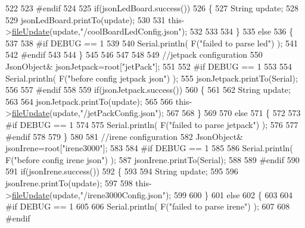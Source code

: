 \begin{DoxyCode}
522 
523 \textcolor{preprocessor}{#endif}
524 
525     \textcolor{keywordflow}{if}(jsonLedBoard.success())
526     \{   
527         String update;
528     
529         jsonLedBoard.printTo(update);
530 
531         this->\hyperlink{classCoolFileSystem_a13f2958f5b87757c31fc53797a30d23a}{fileUpdate}(update,\textcolor{stringliteral}{"/coolBoardLedConfig.json"});      
532 
533     
534     \}
535     \textcolor{keywordflow}{else}
536     \{
537     
538 \textcolor{preprocessor}{    #if DEBUG == 1 }
539 
540         Serial.println( F(\textcolor{stringliteral}{"failed to parse led"}) );
541     
542 \textcolor{preprocessor}{    #endif }
543 
544     \}
545         
546 
547     
548 
549     \textcolor{comment}{//jetpack configuration}
550         JsonObject& jsonJetpack=root[\textcolor{stringliteral}{"jetPack"}];
551 
552 \textcolor{preprocessor}{#if DEBUG == 1 }
553 
554     Serial.println( F(\textcolor{stringliteral}{"before config jetpack json"}) );
555     jsonJetpack.printTo(Serial);
556 
557 \textcolor{preprocessor}{#endif}
558 
559     \textcolor{keywordflow}{if}(jsonJetpack.success())
560     \{
561     
562         String update;
563     
564         jsonJetpack.printTo(update);
565 
566         this->\hyperlink{classCoolFileSystem_a13f2958f5b87757c31fc53797a30d23a}{fileUpdate}(update,\textcolor{stringliteral}{"/jetPackConfig.json"});       
567 
568     \}
569 
570     \textcolor{keywordflow}{else}
571     \{
572     
573 \textcolor{preprocessor}{    #if DEBUG == 1 }
574 
575         Serial.println( F(\textcolor{stringliteral}{"failed to parse jetpack"}) ); 
576     
577 \textcolor{preprocessor}{    #endif}
578 
579     \}
580     
581     \textcolor{comment}{//irene configuration   }
582         JsonObject& jsonIrene=root[\textcolor{stringliteral}{"irene3000"}];
583     
584 \textcolor{preprocessor}{#if DEBUG == 1 }
585 
586     Serial.println( F(\textcolor{stringliteral}{"before config irene json"}) );    
587     jsonIrene.printTo(Serial);
588 
589 \textcolor{preprocessor}{#endif }
590 
591     \textcolor{keywordflow}{if}(jsonIrene.success())
592     \{
593 
594         String update;
595     
596         jsonIrene.printTo(update);
597 
598         this->\hyperlink{classCoolFileSystem_a13f2958f5b87757c31fc53797a30d23a}{fileUpdate}(update,\textcolor{stringliteral}{"/irene3000Config.json"});     
599     
600     \}
601     \textcolor{keywordflow}{else}
602     \{
603     
604 \textcolor{preprocessor}{    #if DEBUG == 1 }
605 
606         Serial.println( F(\textcolor{stringliteral}{"failed to parse irene"}) );   
607     
608 \textcolor{preprocessor}{    #endif }

\end{DoxyCode}
